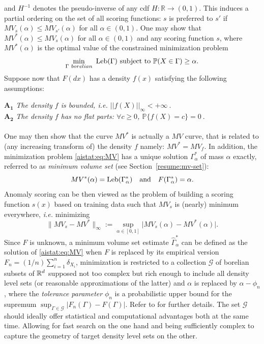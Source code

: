  and $H^{-1}$ denotes the pseudo-inverse of any cdf $H:\mathbb{R}\rightarrow (0,1)$.
%
This induces a partial ordering on the set of all scoring functions: $s$ is
preferred to $s'$ if $MV_{s}(\alpha) \le MV_{s'}(\alpha)$ for all
$\alpha\in(0,1)$.
One may show that $MV^*(\alpha)\leq MV_s(\alpha)$ for all $\alpha\in (0,1)$ and any scoring function $s$, where $MV^*(\alpha)$ is the optimal value of the constrained minimization problem
\begin{equation}\label{aistat:eq:MV}\min_{\Gamma~ borelian} ~\text{Leb}(\Gamma) \mbox{~subject to~} \mathbb{P}(X \in \Gamma) \ge \alpha.
\end{equation}
Suppose now that $F(dx)$ has a density $f(x)$ satisfying the following assumptions:

\noindent $\mathbf{A_1}$ {\it The density $f$ is bounded, \textit{i.e.} $\vert \vert f(X)\vert\vert_{\infty}<+\infty~.$} \\
\noindent $\mathbf{A_2}$ {\it The density $f$ has no flat parts: $\forall c\geq 0$, $\mathbb{P}\{f(X)=c\}=0~.$}\\~\\
 One may then show that the curve $MV^*$ is actually a $MV$ curve, that is related to (any increasing transform of) the density $f$ namely: $MV^*=MV_f$. In addition, the  minimization problem \eqref{aistat:eq:MV} has a unique solution
$\Gamma_\alpha^*$ of mass $\alpha$ exactly, referred to as \textit{minimum volume set} (see Section~\ref{resume:mv-set}): $$MV^*(\alpha)=\text{Leb}(\Gamma^*_\alpha) ~~~\text{and}~~~ F(\Gamma_\alpha^*)=\alpha .$$ Anomaly scoring can be then viewed as the problem of building a scoring function $s(x)$ based on training data such that $MV_s$ is (nearly) minimum everywhere, \textit{i.e.} minimizing $$\|MV_{s}-MV^*\|_{\infty}:=\sup_{\alpha\in[0,1]}\vert MV_s(\alpha)-MV^*(\alpha)\vert.$$
Since $F$ is unknown, a minimum volume set estimate $\widehat{\Gamma}^*_{\alpha}$ can be defined as the solution of \eqref{aistat:eq:MV} when $F$ is replaced by its empirical version
$F_n=(1/n)\sum_{i=1}^n\delta_{X_i}$, minimization is restricted to a collection $\mathcal{G}$ of borelian subsets of $\mathbb{R}^d$ supposed not too complex but rich enough to include all density level sets (or reasonable approximations of the latter) and $\alpha$ is replaced by $\alpha-\phi_n$, where the {\it tolerance parameter} $\phi_n$ is a probabilistic upper bound for the supremum $\sup_{\Gamma\in \mathcal{G}}\vert F_n(\Gamma)-F(\Gamma) \vert$. Refer to \cite{Scott2006} for further details. The set $\mathcal{G}$ should ideally offer statistical and computational advantages both at the same time. Allowing for fast search on the one hand and being sufficiently complex to capture the geometry of target density level sets on the other.
